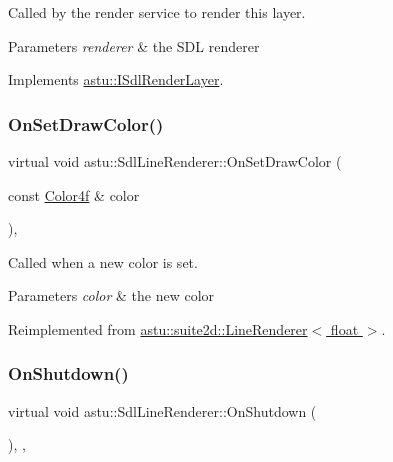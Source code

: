 Called by the render service to render this layer.


\begin{DoxyParams}{Parameters}
{\em renderer} & the S\+DL renderer \\
\hline
\end{DoxyParams}


Implements \hyperlink{classastu_1_1ISdlRenderLayer_a18af53e17e7f6f945817ad3e8b8ecc87}{astu\+::\+I\+Sdl\+Render\+Layer}.

\mbox{\label{classastu_1_1SdlLineRenderer_aefdce772cba5d63ad8c4608df63879f9}} 
\subsubsection{\texorpdfstring{On\+Set\+Draw\+Color()}{OnSetDrawColor()}}
{\footnotesize\ttfamily virtual void astu\+::\+Sdl\+Line\+Renderer\+::\+On\+Set\+Draw\+Color (\begin{DoxyParamCaption}\item[{const \hyperlink{classastu_1_1Color}{Color4f} \&}]{color }\end{DoxyParamCaption})\hspace{0.3cm}{\ttfamily [override]}, {\ttfamily [virtual]}}

Called when a new color is set.


\begin{DoxyParams}{Parameters}
{\em color} & the new color \\
\hline
\end{DoxyParams}


Reimplemented from \hyperlink{classastu_1_1suite2d_1_1LineRenderer_a8571273df1940b8d2059e88abc7e4d5a}{astu\+::suite2d\+::\+Line\+Renderer$<$ float $>$}.

\mbox{\label{classastu_1_1SdlLineRenderer_ae34a6e853b012a77bb3377314332d7a5}} 
\subsubsection{\texorpdfstring{On\+Shutdown()}{OnShutdown()}}
{\footnotesize\ttfamily virtual void astu\+::\+Sdl\+Line\+Renderer\+::\+On\+Shutdown (\begin{DoxyParamCaption}{ }\end{DoxyParamCaption})\hspace{0.3cm}{\ttfamily [override]}, {\ttfamily [protected]}, {\ttfamily [virtual]}}

